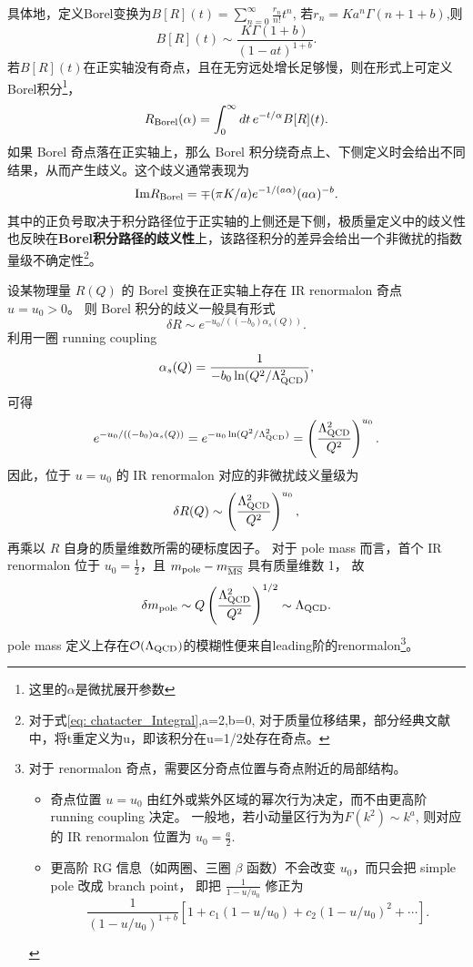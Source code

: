 具体地，定义Borel变换为$B[R](t)=\sum_{n=0}^{\infty} \frac{r_n}{n!}t^n$, 若$r_n=K a^n\Gamma(n+1+b)$,则
$$
B[R](t) \sim \frac{K \Gamma(1+b)}{(1-a t)^{1+b}} .
$$
若$B[R](t)$在正实轴没有奇点，且在无穷远处增长足够慢，则在形式上可定义Borel积分\footnote{这里的$\alpha$是微扰展开参数}，
\begin{equation}
R_{\rm Borel}(\alpha)=\int_{0}^{\infty}dt\,e^{-t/\alpha}B[R](t).
\end{equation}
如果 Borel 奇点落在正实轴上，那么 Borel 积分绕奇点上、下侧定义时会给出不同结果，从而产生歧义。这个歧义通常表现为
\begin{equation}
  \text{Im} R_{\rm Borel}=\mp(\pi K/a) e^{-1/(a\alpha)}(a\alpha)^{-b}.
\end{equation}
其中的正负号取决于积分路径位于正实轴的上侧还是下侧，极质量定义中的歧义性也反映在\textbf{Borel积分路径的歧义性}上，该路径积分的差异会给出一个非微扰的指数量级不确定性\footnote{对于式\eqref{eq: chatacter_Integral},a=2,b=0, 对于质量位移结果，部分经典文献中，将t重定义为u，即该积分在u=1/2处存在奇点。}。

设某物理量 $R(Q)$ 的 Borel 变换在正实轴上存在 IR renormalon 奇点 $u=u_0>0$。
则 Borel 积分的歧义一般具有形式
\[
\delta R \sim e^{-u_0/((-b_0)\alpha_s(Q))}.
\]
利用一圈 running coupling
\[
\alpha_s(Q)=\frac{1}{-b_0\ln(Q^2/\Lambda_{\rm QCD}^2)},
\]
可得
\[
e^{-u_0/((-b_0)\alpha_s(Q))}
=
e^{-u_0\ln(Q^2/\Lambda_{\rm QCD}^2)}
=
\left(\frac{\Lambda_{\rm QCD}^2}{Q^2}\right)^{u_0}.
\]
因此，位于 $u=u_0$ 的 IR renormalon 对应的非微扰歧义量级为
\[
\delta R(Q)\sim \left(\frac{\Lambda_{\rm QCD}^2}{Q^2}\right)^{u_0},
\]
再乘以 $R$ 自身的质量维数所需的硬标度因子。
对于 pole mass 而言，首个 IR renormalon 位于 $u_0=\frac12$，且
$m_{\rm pole}-m_{\overline{\rm MS}}$ 具有质量维数 1，
故
\[
\delta m_{\rm pole}\sim Q\left(\frac{\Lambda_{\rm QCD}^2}{Q^2}\right)^{1/2}
\sim \Lambda_{\rm QCD}.
\]
pole mass 定义上存在$\mathcal{O}(\Lambda_{\rm QCD})$的模糊性便来自leading阶的renormalon\footnote{对于 renormalon 奇点，需要区分奇点位置与奇点附近的局部结构。

\begin{itemize}
    \item 奇点位置 $u=u_0$ 由红外或紫外区域的幂次行为决定，而不由更高阶 running coupling 决定。
    一般地，若小动量区行为为$F(k^2)\sim k^a$,
    则对应的 IR renormalon 位置为
    $
    u_0=\frac{a}{2}.
    $
    \item 更高阶 RG 信息（如两圈、三圈 $\beta$ 函数）不会改变 $u_0$，而只会把 simple pole 改成 branch point，
    即把
    $
    \frac{1}{1-u/u_0}
    $
    修正为
    \[
    \frac{1}{(1-u/u_0)^{1+b}}
    \left[1+c_1(1-u/u_0)+c_2(1-u/u_0)^2+\cdots\right].
    \]
\end{itemize}}。

